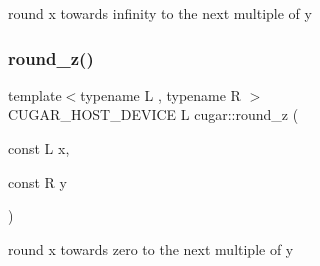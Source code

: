 round x towards infinity to the next multiple of y \mbox{\label{group___basic_utils_ga40a1778d81e29db2dd88253a284b0c62}} 
\subsubsection{\texorpdfstring{round\+\_\+z()}{round\_z()}}
{\footnotesize\ttfamily template$<$typename L , typename R $>$ \\
C\+U\+G\+A\+R\+\_\+\+H\+O\+S\+T\+\_\+\+D\+E\+V\+I\+CE L cugar\+::round\+\_\+z (\begin{DoxyParamCaption}\item[{const L}]{x,  }\item[{const R}]{y }\end{DoxyParamCaption})\hspace{0.3cm}{\ttfamily [inline]}}

round x towards zero to the next multiple of y 